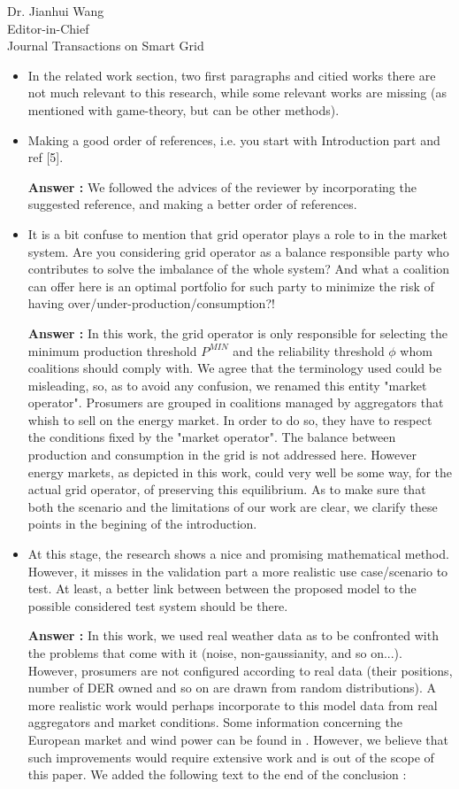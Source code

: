 \documentclass{letter}
\begin{document}
\begin{letter}{Dr. Jianhui Wang \\ Editor-in-Chief \\ Journal Transactions on Smart Grid }
\begin{itemize}
\begin{itemize}
		\item In the related work section, two first paragraphs and citied works there are not much relevant to this research, while some relevant works are missing (as mentioned with game-theory, but can be other methods).

		\item Making a good order of references, i.e. you start with Introduction part and ref [5].

		\textbf{Answer :}  We followed the advices of the reviewer by incorporating the suggested reference, and making a better order of references.
		
		\item It is a bit confuse to mention that grid operator plays a role to in the market system. Are you considering grid operator as a balance responsible party who contributes to solve the imbalance of the whole system? And what a coalition can offer here is an optimal portfolio for such party to minimize the risk of having over/under-production/consumption?!
		
		\textbf{Answer :} In this work, the grid operator is only responsible for selecting the minimum production threshold $P^{MIN}$ and the reliability threshold $ \phi $ whom coalitions should comply with. We agree that the terminology used could be misleading, so, as to avoid any confusion, we renamed this entity "market operator". Prosumers are grouped in coalitions managed by aggregators that whish to sell on the energy market. In order to do so, they have to respect the conditions fixed by the "market operator". The balance between production and consumption in the grid is not addressed here. However energy markets, as depicted in this work, could very well be some way, for the actual grid operator, of preserving this equilibrium. As to make sure that both the scenario and the limitations of our work are clear, we clarify these points in the begining of the introduction.

		
		\item At this stage, the research shows a nice and promising mathematical method. However, it misses in the validation part a more realistic use case/scenario to test. At least, a better link between between the proposed model to the possible considered test system should be there.
		
		\textbf{Answer :} In this work, we used real weather data as to be confronted with the problems that come with it (noise, non-gaussianity, and so on...). However, prosumers are not configured according to real data (their positions, number of DER owned and so on are drawn from random distributions). A more realistic work would perhaps incorporate to this model data from real aggregators and market conditions. Some information concerning the European market and wind power can be found in \cite{Europe}. However, we believe that such improvements would require extensive work and is out of the scope of this paper. We added the following text to the end of the conclusion : 
		

\end{itemize}
\end{itemize}
\end{letter}
\end{document}

